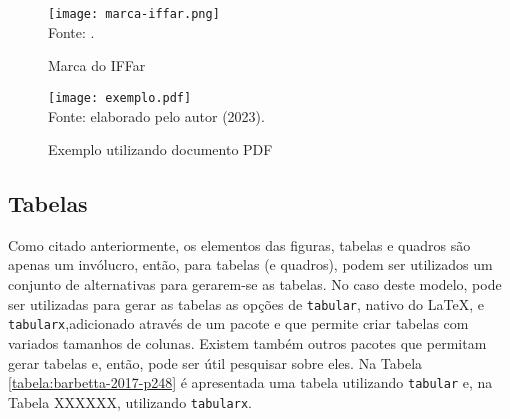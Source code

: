   \begin{figure}[H]
    \Centering\singlespacing
    \caption{Marca do IFFar}
    \label{figura:marca-iffar} %
    \texttt{[image: marca-iffar.png]}\\
    \footnotesize
    Fonte: \textcite{site:iffar-identidade-visual-2021}.
  \end{figure}

  \begin{figure}[H]
    \Centering\singlespacing
    \caption{Exemplo utilizando documento PDF}
    \label{figura:pdf}
    \texttt{[image: exemplo.pdf]}\\
    \footnotesize
    Fonte: elaborado pelo autor (2023).
  \end{figure}
  
\subsection{Tabelas}
  Como citado anteriormente, os elementos das figuras, tabelas e quadros são apenas um invólucro, então, para tabelas (e quadros), podem ser utilizados um conjunto de alternativas para gerarem-se as tabelas. No caso deste modelo, pode ser utilizadas para gerar as tabelas as opções de \verb|tabular|, nativo do LaTeX, e \verb|tabularx|,adicionado através de um pacote e que permite criar tabelas com variados tamanhos de colunas. Existem também outros pacotes que permitam gerar tabelas e, então, pode ser útil pesquisar sobre eles. Na Tabela \ref{tabela:barbetta-2017-p248} é apresentada uma tabela utilizando \verb|tabular| e, na Tabela XXXXXX, utilizando \verb|tabularx|.

